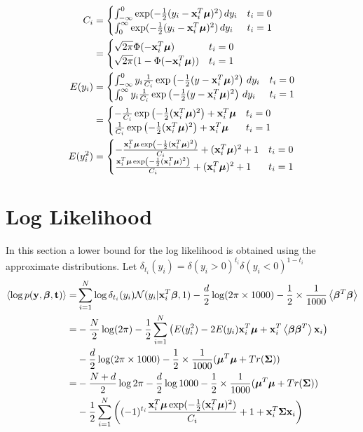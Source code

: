 \documentclass{article}
\begin{document}
\begin{align}
\nonumber C_i&=\begin{cases}
\int_{-\infty}^{0}\exp(-\frac{1}{2}(y_i-\mathbf{x}_i^T{\boldsymbol{\mu}})^2)\,dy_i & t_i=0\\
\int_{0}^{\infty}\exp(-\frac{1}{2}(y_i-\mathbf{x}_i^T{\boldsymbol{\mu}})^2)\,dy_i & t_i=1\\
\end{cases}\\
&=\begin{cases}
\sqrt{2\pi}\Phi(-\mathbf{x}_i^T{\boldsymbol{\mu}}) & t_i=0\\
\sqrt{2\pi}(1-\Phi(-\mathbf{x}_i^T{\boldsymbol{\mu}})) & t_i=1\\
\end{cases}\\
\nonumber E(y_i)&=\begin{cases}
\int_{-\infty}^{0}y_i\frac{1}{C_i}\exp\left(-\frac{1}{2}(y-\mathbf{x}_i^T{\boldsymbol{\mu}})^2\right)\,dy_i & t_i=0\\
\int_{0}^{\infty}y_i\frac{1}{C_i}\exp\left(-\frac{1}{2}(y-\mathbf{x}_i^T{\boldsymbol{\mu}})^2\right)\,dy_i & t_i=1
\end{cases}\\
&=\begin{cases}
-\frac{1}{C_i}\exp\left(-\frac{1}{2}(\mathbf{x}_i^T{\boldsymbol{\mu}})^2\right)+\mathbf{x}_i^T{\boldsymbol{\mu}} & t_i=0\\
\frac{1}{C_i}\exp\left(-\frac{1}{2}(\mathbf{x}_i^T{\boldsymbol{\mu}})^2\right)+\mathbf{x}_i^T{\boldsymbol{\mu}} & t_i=1
\end{cases}\\
\nonumber E(y_i^2)&=\begin{cases}
-\frac{\mathbf{x}_i^T{\boldsymbol{\mu}}\exp\left(-\frac{1}{2}(\mathbf{x}_i^T{\boldsymbol{\mu}})^2\right)}{C_i}+(\mathbf{x}_i^T{\boldsymbol{\mu}})^2+1 & t_i=0\\
\frac{\mathbf{x}_i^T{\boldsymbol{\mu}}\exp\left(-\frac{1}{2}(\mathbf{x}_i^T{\boldsymbol{\mu}})^2\right)}{C_i}+(\mathbf{x}_i^T{\boldsymbol{\mu}})^2+1 & t_i=1
\end{cases}
\end{align}

\section{Log Likelihood}
In this section a lower bound for the log likelihood is obtained using the approximate distributions. Let $\delta_{t_i}(y_i)=\delta(y_i>0)^{t_i}\delta(y_i<0)^{1-t_i}$
\begin{align}
\nonumber \left\langle\log p(\mathbf{y},\bm{\beta},{\mathbf{t}})\right\rangle=&\sum_{i=1}^{N}\log\delta_{t_i}(y_i){\mathcal{N}}(y_i|\mathbf{x}_i^T\bm{\beta},1)-\frac{d}{2}\log(2\pi\times1000)-\frac{1}{2}\times\frac{1}{1000}\left\langle\bm{\beta}^T\bm{\beta}\right\rangle\\
\nonumber =&-\frac{N}{2}\log(2\pi)-\frac{1}{2}\sum_{i=1}^{N}\left( E(y_i^2)-2E(y_i)\mathbf{x}_i^T{\boldsymbol{\mu}}+\mathbf{x}_i^T\left\langle\bm{\beta}\bm{\beta}^T\right\rangle\mathbf{x}_i\right)\\
\nonumber &-\frac{d}{2}\log(2\pi\times1000)-\frac{1}{2}\times\frac{1}{1000}({\boldsymbol{\mu}}^T{\boldsymbol{\mu}}+Tr({\mathbf{\Sigma}}))\\
\nonumber=&-\frac{N+d}{2}\log 2\pi-\frac{d}{2}\log 1000-\frac{1}{2}\times\frac{1}{1000}({\boldsymbol{\mu}}^T{\boldsymbol{\mu}}+Tr({\mathbf{\Sigma}}))\\
&-\frac{1}{2}\sum_{i=1}^{N}\left((-1)^{t_i}\frac{\mathbf{x}_i^T{\boldsymbol{\mu}}\exp(-\frac{1}{2}(\mathbf{x}_i^T{\boldsymbol{\mu}})^2)}{C_i}+1+\mathbf{x}_i^T{\mathbf{\Sigma}}\mathbf{x}_i\right)
\end{align}
\end{document}
